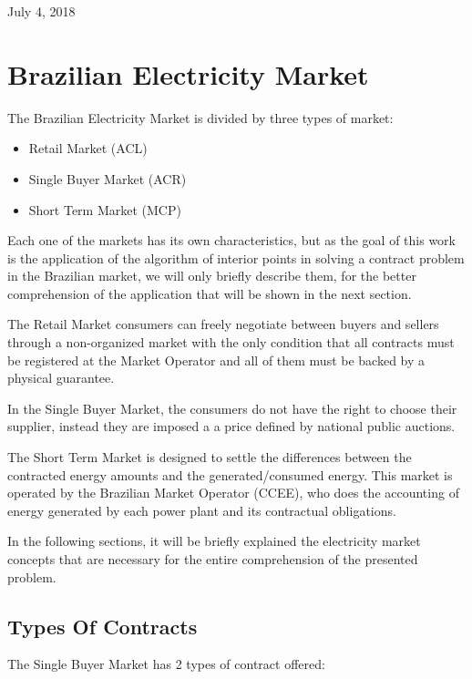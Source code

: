 \documentclass[a4paper]{IEEEtran}
\begin{document}

 
\hfill July 4, 2018

\section{Brazilian Electricity Market}
The Brazilian Electricity Market is divided by three types of market: 

\begin{itemize}
	\item Retail Market (ACL)
	\item Single Buyer Market (ACR)
	\item Short Term Market (MCP) 
\end{itemize}

Each one of the markets has its own characteristics, but as the goal of this work is the application of the algorithm of interior points in solving a contract problem in the Brazilian market, we will only briefly describe them, for the better comprehension of the application that will be shown in the next section. 

The Retail Market consumers can freely negotiate between buyers and sellers through a non-organized market with the only condition that all contracts must be registered at the Market Operator and all of them must be backed by a physical guarantee.

In the Single Buyer Market, the consumers do not have the right to choose their supplier, instead they are imposed a a price defined by national public auctions.

The Short Term Market is designed to settle the differences between the contracted energy amounts and the generated/consumed energy. This market is operated by the Brazilian Market Operator (CCEE), who does the accounting of energy generated by each power plant and its contractual obligations.


In the following sections, it will be briefly explained the electricity market concepts that are necessary for the entire comprehension of the presented problem.

\subsection{Types Of Contracts}
The Single Buyer Market has 2 types of contract offered:
\end{document}
